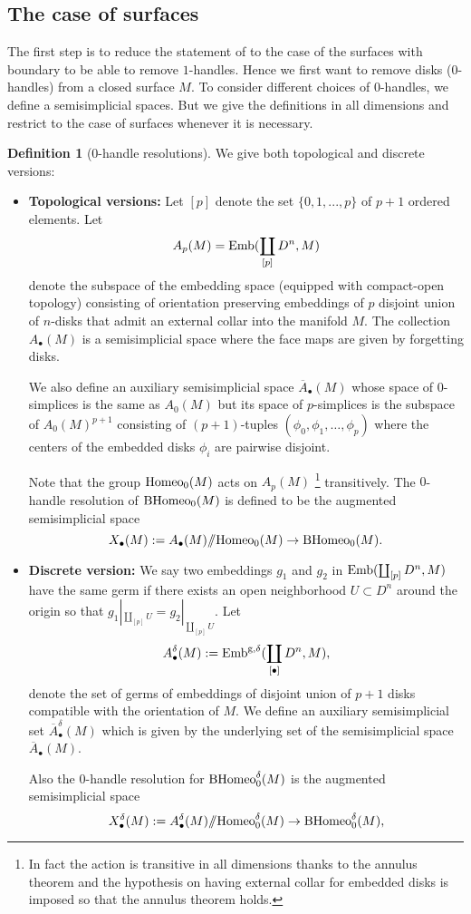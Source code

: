 \documentclass[a4paper]{amsart}
\theoremstyle{definition}
\newtheorem{defn}[thm]{Definition}
\theoremstyle{remark}
\newcommand{\hcoker}{/\!\!/}
\newcommand{\tH}{\text{\textnormal{Homeo}}}
\newcommand{\BH}{\mathrm{B}\text{\textnormal{Homeo}}}
\newcommand{\tdH}{\text{Homeo}^{\delta}}
\newcommand{\BdH}{\mathrm{B}\text{\textnormal{Homeo}}^{\delta}}
\numberwithin{equation}{section}
\begin{document}
\subsection{The case of surfaces} \label{disk}The first step is to reduce the statement of   to the case of the surfaces with boundary to be able to remove $1$-handles. Hence we first want to remove  disks ($0$-handles) from a closed surface $M$. To consider different choices of $0$-handles, we define a semisimplicial spaces. But we give the definitions in all dimensions and restrict to the case of surfaces whenever it is necessary. 
\begin{defn}[$0$-handle resolutions] \label{def1}We give both topological and discrete versions:
\begin{itemize}[leftmargin=*]\item {\bf Topological versions:}
Let $[p]$ denote the set $\{0,1,...,p\}$ of $p+1$ ordered elements. Let $$ A_p(M)=\text{\textnormal{Emb}}(\coprod_{[p]} D^n, M)$$ denote the subspace of the embedding space (equipped with compact-open topology) consisting of  orientation preserving  embeddings of $p$ disjoint union of $n$-disks that admit an external collar into the manifold $M$.  The collection $A_{\bullet}(M)$ is a semisimplicial space where the face maps are given by forgetting disks. 

We also define an auxiliary semisimplicial space $\overline{A}_{\bullet}(M)$ whose space of $0$-simplices is the same as $A_0(M)$ but its space of $p$-simplices is the subspace of $A_0(M)^{p+1}$ consisting of $(p+1)$-tuples $(\phi_0,\phi_1,\dots,\phi_p)$ where the centers of the embedded disks $\phi_i$ are pairwise disjoint.

Note that the group $\tH_0(M)$ acts on $A_p(M)$ \footnote{In fact the action is transitive in all dimensions thanks to the annulus theorem and the hypothesis on having external collar for embedded disks is imposed so that the annulus theorem holds.} transitively.  The $0$-handle resolution of $\BH_0(M)$ is defined to be the augmented semisimplicial space
\[
X_{\bullet}(M):= A_{\bullet}(M)\hcoker \tH_0(M)\to \BH_0(M).
\]
\item {\bf Discrete version:} We say two embeddings $g_1$ and $g_2$ in $ \text{\textnormal{Emb}}(\coprod_{[p]} D^n, M)$ have the same germ if there exists an open neighborhood $U\subset D^n$ around the origin so that $g_1|_{\coprod_{[p]} U}= g_2|_{\coprod_{[p]} U}$. Let
\[
A^{\delta}_{\bullet}(M):= \text{\textnormal{Emb}}^{\text{g},\delta}(\coprod_{[\bullet]} D^n, M),
\]
denote the set of germs of embeddings of disjoint union of $p+1$ disks compatible with the orientation of $M$. We define an auxiliary semisimplicial set $\overline{A}^{\delta}_{\bullet}(M)$ which is given by the underlying set of the semisimplicial space $\overline{A}_{\bullet}(M)$.

Also the $0$-handle resolution for $\BdH_0(M)$ is the augmented semisimplicial space
\[
X_{\bullet}^{\delta}(M):= A_{\bullet}^{\delta}(M)\hcoker \tdH_0(M)\to \BdH_0(M),
\]
\end{itemize}
\end{defn}
\end{document}
